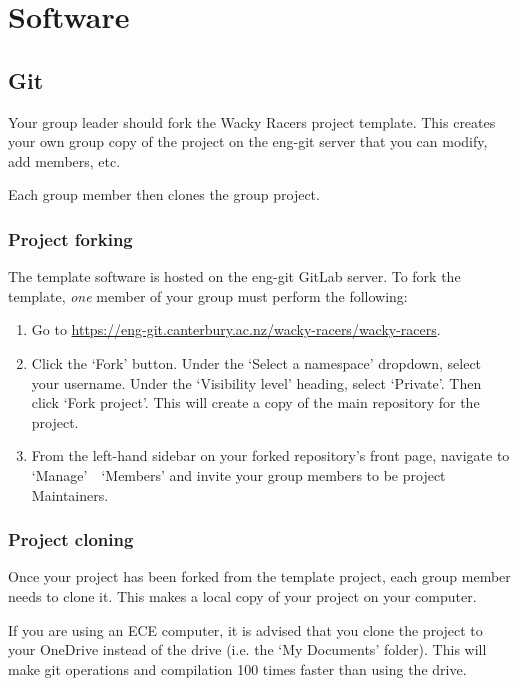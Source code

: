 \chapter{Software}
\label{software}



\section{Git}

Your group leader should fork the Wacky Racers project template.  This
creates your own group copy of the project on the eng-git server that
you can modify, add members, etc.

Each group member then clones the group project.


\subsection{Project forking}
\label{project-forking}

The template software is hosted on the eng-git GitLab server. To fork the
template, \emph{one} member of your group must perform the following:
\begin{enumerate}
\item
  Go to \url{https://eng-git.canterbury.ac.nz/wacky-racers/wacky-racers}.
\item
  Click the `Fork' button. Under the `Select a namespace' dropdown, select your
  username. Under the `Visibility level' heading, select `Private'. Then click
  `Fork project'. This will create a copy of the main repository for the
  project.
\item
  From the left-hand sidebar on your forked repository's front page, navigate to
  `Manage'~\textrightarrow~`Members' and invite your group members to be project
  Maintainers.
\end{enumerate}


\subsection{Project cloning}
\label{project-cloning}

Once your project has been forked from the template project, each group
member needs to clone it. This makes a local copy of your project on
your computer.

If you are using an ECE computer, it is advised that you clone the
project to your OneDrive instead of the  drive (i.e. the `My
Documents' folder). This will make git operations and compilation
100 times faster than using the  drive.

